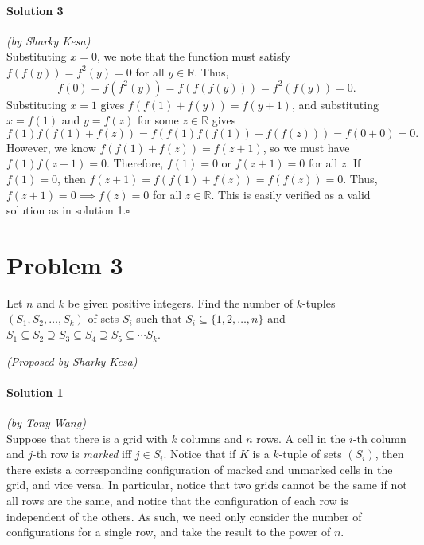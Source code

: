 \documentclass[10pt]{article}
\begin{document}
		\noindent \makebox[\linewidth]{\rule{\textwidth}{0.4pt}}
	
	\paragraph{Solution 3} \textit{(by Sharky Kesa)}\\
	
	\noindent Substituting \(x=0\), we note that the function must satisfy \(f(f(y)) = f^2(y) = 0\) for all \(y \in \mathbb{R}\). Thus, \[f(0) = f(f^2(y)) = f(f(f(y))) = f^2(f(y)) = 0.\] Substituting \(x=1\) gives \(f(f(1)+f(y)) = f(y+1)\), and substituting \(x=f(1)\) and \(y=f(z)\) for some \(z \in \mathbb{R}\) gives \[f(1)f(f(1)+f(z)) = f(f(1)f(f(1)) + f(f(z)))=f(0+0)=0.\] However, we know \(f(f(1)+f(z))=f(z+1)\), so we must have \(f(1) f(z+1) = 0\). Therefore, \(f(1)=0\) or \(f(z+1)=0\) for all \(z\). If \(f(1)=0\), then \(f(z+1)=f(f(1)+f(z))=f(f(z))=0\). Thus, \(f(z+1)=0 \implies f(z) = 0\) for all \(z \in \mathbb{R}\). This is easily verified as a valid solution as in solution 1.\hfill\ensuremath{\square}
	
	\newpage
	
	\section*{Problem 3}
	
	Let \(n\) and \(k\) be given positive integers.  Find the number of \(k\)-tuples \((S_1, S_2, \dots, S_k)\) of sets \(S_i\) such that \(S_i \subseteq \{1, 2, \dots, n\}\) and \(S_1 \subseteq S_2 \supseteq S_3 \subseteq S_4 \supseteq S_5 \subseteq \cdots S_k\).
	\begin{flushright}
	\textit{(Proposed by Sharky Kesa)}
	\end{flushright}
	
		\noindent \makebox[\linewidth]{\rule{\textwidth}{0.4pt}}
	
	\paragraph{Solution 1} \textit{(by Tony Wang)}\\
	
	\noindent Suppose that there is a grid with \(k\) columns and \(n\) rows. A cell in the \(i\)-th column and \(j\)-th row is \emph{marked} iff \(j \in S_i\). Notice that if \(K\) is a \(k\)-tuple of sets \((S_i)\), then there exists a corresponding configuration of marked and unmarked cells in the grid, and vice versa. In particular, notice that two grids cannot be the same if not all rows are the same, and notice that the configuration of each row is independent of the others. As such, we need only consider the number of configurations for a single row, and take the result to the power of \(n\).
		
\end{document}
